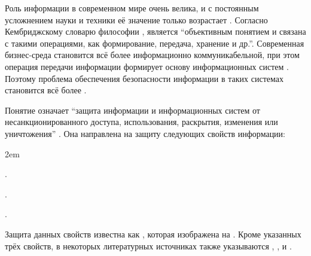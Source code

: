 %
%
Роль информации в современном мире очень велика, и с постоянным усложнением науки и техники её значение только возрастает .
%
Согласно Кембриджскому словарю философии ,  является ``объективным понятием и связана с такими операциями, как формирование, передача, хранение и др.''.
%
Современная бизнес-среда становится всё более информационно коммуникабельной, при этом операция передачи информации формирует основу информационных систем . 
%
Поэтому проблема обеспечения безопасности информации в таких системах становится всё более .

%
Понятие  означает ``защита информации и информационных систем от несанкционированного доступа, использования, раскрытия, изменения или уничтожения'' . 
%
Она направлена на защиту следующих свойств информации:
\begin{description}
	\leftskip2em%
	\setlength{\itemsep}{0pt}%
	\setlength{\parsep}{0pt}%

	\item[Целостность] .

	\item[Конфиденциальность] .

	\item[Доступность] .
\end{description}

%
Защита данных свойств известна как , которая изображена на . 
%
Кроме указанных трёх свойств, в некоторых литературных источниках также указываются , ,  и  . 


